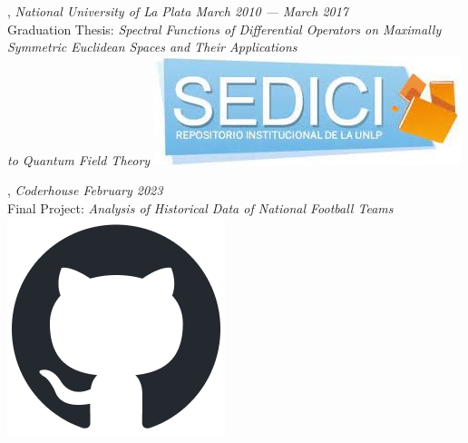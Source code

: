 
, \textit{National University of La Plata	\hfill March 2010 --- March 2017}
\\ \hspace{0.3cm}  Graduation Thesis: \textit{Spectral Functions of Differential Operators on Maximally Symmetric Euclidean Spaces and Their Applications
\\ \hspace{0.3cm} to Quantum Field Theory} \hspace{0.1 cm} \href{http://sedici.unlp.edu.ar/handle/10915/77384}{\includegraphics[scale=0.08]{sedici.jpg}}

\vspace{0.1 cm}

, \textit{Coderhouse \hfill	February 2023}
\\ \hspace{0.3 cm}  Final Project: \textit{Analysis of Historical Data of National Football Teams} \hspace{0.1 cm} \href{https://github.com/juanjogervasio/Data-Analytics-Coderhouse}{\includegraphics[scale=0.2]{github-mark.png}}

\vspace{0.1 cm}

